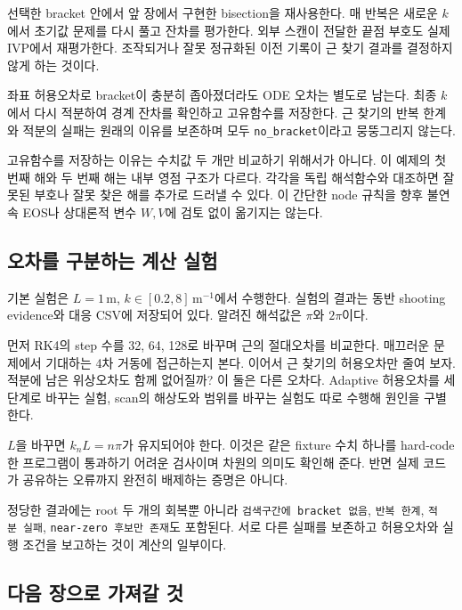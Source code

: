 \documentclass[
  10pt,
  a4paper,
]{article}
\begin{document}
선택한 bracket 안에서 앞 장에서 구현한 bisection을 재사용한다. 매 반복은
새로운 \(k\)에서 초기값 문제를 다시 풀고 잔차를 평가한다. 외부 스캔이
전달한 끝점 부호도 실제 IVP에서 재평가한다. 조작되거나 잘못 정규화된
이전 기록이 근 찾기 결과를 결정하지 않게 하는 것이다.

좌표 허용오차로 bracket이 충분히 좁아졌더라도 ODE 오차는 별도로 남는다.
최종 \(k\)에서 다시 적분하여 경계 잔차를 확인하고 고유함수를 저장한다.
근 찾기의 반복 한계와 적분의 실패는 원래의 이유를 보존하며 모두
\texttt{no\_bracket}이라고 뭉뚱그리지 않는다.

고유함수를 저장하는 이유는 수치값 두 개만 비교하기 위해서가 아니다. 이
예제의 첫 번째 해와 두 번째 해는 내부 영점 구조가 다르다. 각각을 독립
해석함수와 대조하면 잘못된 부호나 잘못 찾은 해를 추가로 드러낼 수 있다.
이 간단한 node 규칙을 향후 불연속 EOS나 상대론적 변수 \(W,V\)에 검토
없이 옮기지는 않는다.

\subsection{오차를 구분하는 계산
실험}\label{uxc624uxcc28uxb97c-uxad6cuxbd84uxd558uxb294-uxacc4uxc0b0-uxc2e4uxd5d8}

기본 실험은 \(L=1\,\mathrm{m}\), \(k\in[0.2,8]\,\mathrm{m}^{-1}\)에서
수행한다. 실험의 결과는 동반 shooting evidence와 대응 CSV에 저장되어
있다. 알려진 해석값은 \(\pi\)와 \(2\pi\)이다.

먼저 RK4의 step 수를 32, 64, 128로 바꾸며 근의 절대오차를 비교한다.
매끄러운 문제에서 기대하는 4차 거동에 접근하는지 본다. 이어서 근 찾기의
허용오차만 줄여 보자. 적분에 남은 위상오차도 함께 없어질까? 이 둘은 다른
오차다. Adaptive 허용오차를 세 단계로 바꾸는 실험, scan의 해상도와
범위를 바꾸는 실험도 따로 수행해 원인을 구별한다.

\(L\)을 바꾸면 \(k_n L=n\pi\)가 유지되어야 한다. 이것은 같은 fixture
수치 하나를 hard-code한 프로그램이 통과하기 어려운 검사이며 차원의
의미도 확인해 준다. 반면 실제 코드가 공유하는 오류까지 완전히 배제하는
증명은 아니다.

정당한 결과에는 root 두 개의 회복뿐 아니라
\texttt{검색구간에\ bracket\ 없음}, \texttt{반복\ 한계},
\texttt{적분\ 실패}, \texttt{near-zero\ 후보만\ 존재}도 포함된다. 서로
다른 실패를 보존하고 허용오차와 실행 조건을 보고하는 것이 계산의
일부이다.

\subsection{다음 장으로 가져갈
것}\label{uxb2e4uxc74c-uxc7a5uxc73cuxb85c-uxac00uxc838uxac08-uxac83}
\end{document}
